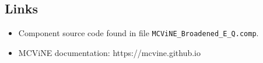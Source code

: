 \subsection*{Links}
\begin{itemize}
  \item Component source code found in file \texttt{MCViNE\_Broadened\_E\_Q.comp}.
  \item MCViNE documentation: https://mcvine.github.io
\end{itemize}
